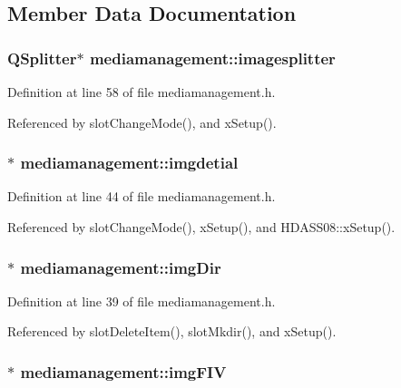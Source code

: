 \subsection{Member Data Documentation}
\subsubsection{\setlength{\rightskip}{0pt plus 5cm}QSplitter$\ast$ {\bf mediamanagement::imagesplitter}\hspace{0.3cm}{\tt  [private]}}\label{classmediamanagement_mediamanagementr0}




Definition at line 58 of file mediamanagement.h.

Referenced by slot\-Change\-Mode(), and x\-Setup().
\subsubsection{$\ast$ {\bf mediamanagement::imgdetial}}\label{classmediamanagement_mediamanagemento6}




Definition at line 44 of file mediamanagement.h.

Referenced by slot\-Change\-Mode(), x\-Setup(), and HDASS08::x\-Setup().
\subsubsection{$\ast$ {\bf mediamanagement::img\-Dir}}\label{classmediamanagement_mediamanagemento0}




Definition at line 39 of file mediamanagement.h.

Referenced by slot\-Delete\-Item(), slot\-Mkdir(), and x\-Setup().
\subsubsection{$\ast$ {\bf mediamanagement::img\-FIV}}\label{classmediamanagement_mediamanagemento2}





